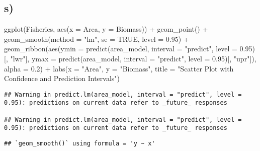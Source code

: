\documentclass[
]{article}
\newenvironment{Shaded}{\begin{snugshade}}{\end{snugshade}}
\newcommand{\AttributeTok}[1]{\textcolor[rgb]{0.77,0.63,0.00}{#1}}
\newcommand{\ConstantTok}[1]{\textcolor[rgb]{0.00,0.00,0.00}{#1}}
\newcommand{\FloatTok}[1]{\textcolor[rgb]{0.00,0.00,0.81}{#1}}
\newcommand{\FunctionTok}[1]{\textcolor[rgb]{0.00,0.00,0.00}{#1}}
\newcommand{\NormalTok}[1]{#1}
\newcommand{\SpecialCharTok}[1]{\textcolor[rgb]{0.00,0.00,0.00}{#1}}
\newcommand{\StringTok}[1]{\textcolor[rgb]{0.31,0.60,0.02}{#1}}
\begin{document}
\hypertarget{s}{%
\subsection{s)}\label{s}}

\begin{Shaded}
\begin{Highlighting}[]
\FunctionTok{ggplot}\NormalTok{(Fisheries, }\FunctionTok{aes}\NormalTok{(}\AttributeTok{x =}\NormalTok{ Area, }\AttributeTok{y =}\NormalTok{ Biomass)) }\SpecialCharTok{+}
  \FunctionTok{geom\_point}\NormalTok{() }\SpecialCharTok{+}
  \FunctionTok{geom\_smooth}\NormalTok{(}\AttributeTok{method =} \StringTok{"lm"}\NormalTok{, }\AttributeTok{se =} \ConstantTok{TRUE}\NormalTok{, }\AttributeTok{level =} \FloatTok{0.95}\NormalTok{) }\SpecialCharTok{+}
  \FunctionTok{geom\_ribbon}\NormalTok{(}\FunctionTok{aes}\NormalTok{(}\AttributeTok{ymin =} \FunctionTok{predict}\NormalTok{(area\_model, }
                                 \AttributeTok{interval =} \StringTok{"predict"}\NormalTok{, }
                                 \AttributeTok{level =} \FloatTok{0.95}\NormalTok{)[, }\StringTok{"lwr"}\NormalTok{], }
                  \AttributeTok{ymax =} \FunctionTok{predict}\NormalTok{(area\_model, }
                                 \AttributeTok{interval =} \StringTok{"predict"}\NormalTok{, }
                                 \AttributeTok{level =} \FloatTok{0.95}\NormalTok{)[, }\StringTok{"upr"}\NormalTok{]), }
              \AttributeTok{alpha =} \FloatTok{0.2}\NormalTok{) }\SpecialCharTok{+}
  \FunctionTok{labs}\NormalTok{(}\AttributeTok{x =} \StringTok{"Area"}\NormalTok{, }
       \AttributeTok{y =} \StringTok{"Biomass"}\NormalTok{, }
       \AttributeTok{title =} \StringTok{"Scatter Plot with Confidence and Prediction Intervals"}\NormalTok{)}
\end{Highlighting}
\end{Shaded}

\begin{verbatim}
## Warning in predict.lm(area_model, interval = "predict", level = 0.95): predictions on current data refer to _future_ responses

## Warning in predict.lm(area_model, interval = "predict", level = 0.95): predictions on current data refer to _future_ responses
\end{verbatim}

\begin{verbatim}
## `geom_smooth()` using formula = 'y ~ x'
\end{verbatim}
\end{document}
